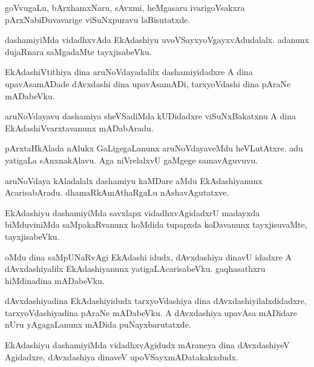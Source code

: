 \begin{mng}
goVvugaLu, bArxhamxNaru, sAvxmi, heMgasaru ivarigoVsakxra pArxNabiDuvavarige viSuNxpuravu laBisutatxde.
\end{mng}

\begin{mng}
dashamiyiMda vidadhxvAda EkAdashiyu uvoVSayxyoVgayxvAdudalalx. adanunx dujaRnara saMgadaMte tayxjisabeVku.
\end{mng}

\begin{mng}
EkAdashiVtithiya dina aruNoVdayadalilx dashamiyidadxre A dina upavAsamADade dAvxdashi dina upavAsamADi, tarxyoVdashi dina pAraNe mADabeVku.
\end{mng}

\begin{mng}
aruNoVdayavu dashamiya sheVSadiMda kUDidadxre viSuNxBakatxnu A dina EkAdashiVvarxtavanunx mADabAradu.
\end{mng}

\begin{mng}
pArxtaHkAlada nAlukx GaLigegaLanunx aruNoVdayaveMdu heVLutAtxre. adu yatigaLa sAnxnakAlavu. Aga niVrelalxvU gaMgege samavAguvuvu.
\end{mng}

\begin{mng}
aruNoVdaya kAladalalx dashamiyu kaMDare aMdu EkAdashiyanunx AcarisabAradu. dhamaRkAmAthaRgaLu nAshavAgutatxve.
\end{mng}

\begin{mng}
EkAdashiyu dashamiyiMda savxlapx vidadhxvAgidadxrU madayxda biMduviniMda saMpakaRvanunx hoMdida tupapxda koDavanunx tayxjisuvaMte, tayxjisabeVku.
\end{mng}

\begin{mng}
oMdu dina saMpUNaRvAgi EkAdashi idudx, dAvxdashiya dinavU idadxre A dAvxdashiyalilx EkAdashiyanunx yatigaLAcarisabeVku. gaqhasathxru hiMdinadina mADabeVku.
\end{mng}

\begin{mng}
dAvxdashiyadina EkAdashiyidudx tarxyoVdashiya dina dAvxdashiyilalxdidadxre, tarxyoVdashiyadina pAraNe mADabeVku. A dAvxdashiya upavAsa mADidare nUru yAgagaLanunx mADida puNayxbarutatxde.
\end{mng}

\begin{mng}
EkAdashiyu dashamiyiMda vidadhxvAgidudx mAraneya dina dAvxdashiyeV Agidadxre, dAvxdashiya dinaveV upoVSayxmADatakakxdudx.
\end{mng}

